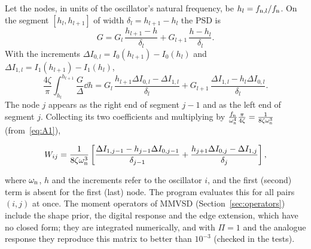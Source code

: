 Let the nodes, in units of the oscillator's natural frequency, be $h_l = f_{\mathrm{n},l}/f_{\mathrm{n}}$. On the
segment $[h_l, h_{l+1}]$ of width $\delta_l = h_{l+1}-h_l$ the PSD is
\begin{equation}
  G = G_l\,\frac{h_{l+1}-h}{\delta_l} + G_{l+1}\,\frac{h-h_l}{\delta_l}.
\end{equation}
With the increments $\Delta I_{0,l} = I_0(h_{l+1})-I_0(h_l)$ and $\Delta I_{1,l} = I_1(h_{l+1})-I_1(h_l)$,
\begin{equation}
  \frac{4\zeta}{\pi}\int_{h_l}^{h_{l+1}}\frac{G}{\Delta}\dd h
  = G_l\,\frac{h_{l+1}\Delta I_{0,l}-\Delta I_{1,l}}{\delta_l} + G_{l+1}\,\frac{\Delta I_{1,l}-h_l\Delta I_{0,l}}{\delta_l}.
\end{equation}
The node $j$ appears as the right end of segment $j-1$ and as the left end of segment $j$. Collecting
its two coefficients and multiplying by $\frac{f_{\mathrm{n}}}{\omega_{\mathrm{n}}^4}\frac{\pi}{4\zeta} = \frac{1}{8\zeta\omega_{\mathrm{n}}^3}$
(from~\eqref{eq:A1}),
\begin{result}
\begin{equation}
  W_{ij} = \frac{1}{8\zeta\omega_{\mathrm{n}}^3}\left[\frac{\Delta I_{1,j-1}-h_{j-1}\Delta I_{0,j-1}}{\delta_{j-1}}
  + \frac{h_{j+1}\Delta I_{0,j}-\Delta I_{1,j}}{\delta_j}\right],
\end{equation}
\end{result}
where $\omega_{\mathrm{n}}$, $h$ and the increments refer to the oscillator $i$, and the first (second) term is absent
for the first (last) node. The program evaluates this for all pairs $(i,j)$ at once. The moment
operators of MMVSD (Section~\ref{sec:operators}) include the shape prior, the digital response and the
edge extension, which have no closed form; they are integrated numerically, and with $\Pi = 1$ and the
analogue response they reproduce this matrix to better than $10^{-3}$ (checked in the tests).
